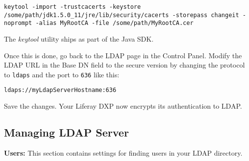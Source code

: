 \begin{verbatim}
keytool -import -trustcacerts -keystore /some/path/jdk1.5.0_11/jre/lib/security/cacerts -storepass changeit -noprompt -alias MyRootCA -file /some/path/MyRootCA.cer
\end{verbatim}

The \emph{keytool} utility ships as part of the Java SDK.

Once this is done, go back to the LDAP page in the Control Panel. Modify
the LDAP URL in the Base DN field to the secure version by changing the
protocol to \texttt{ldaps} and the port to \texttt{636} like this:

\begin{verbatim}
ldaps://myLdapServerHostname:636
\end{verbatim}

Save the changes. Your Liferay DXP now encrypts its authentication to
LDAP.

\subsection{Managing LDAP Server}\label{managing-ldap-server}

\textbf{Users:} This section contains settings for finding users in your
LDAP directory.

